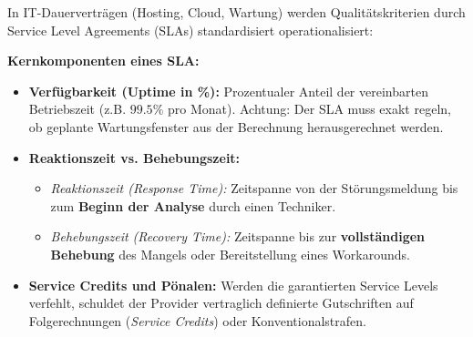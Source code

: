 In IT-Dauerverträgen (Hosting, Cloud, Wartung) werden Qualitätskriterien durch Service Level Agreements (SLAs) standardisiert operationalisiert:

\begin{definition}
    \textbf{Kernkomponenten eines SLA:}
    \begin{itemize}
        \item \textbf{Verfügbarkeit (Uptime in \%):} Prozentualer Anteil der vereinbarten Betriebszeit (z.B. $99.5\%$ pro Monat). Achtung: Der SLA muss exakt regeln, ob geplante Wartungsfenster aus der Berechnung herausgerechnet werden.
        \item \textbf{Reaktionszeit vs. Behebungszeit:}
        \begin{itemize}
            \item \textit{Reaktionszeit (Response Time):} Zeitspanne von der Störungsmeldung bis zum \textbf{Beginn der Analyse} durch einen Techniker.
            \item \textit{Behebungszeit (Recovery Time):} Zeitspanne bis zur \textbf{vollständigen Behebung} des Mangels oder Bereitstellung eines Workarounds.
        \end{itemize}
        \item \textbf{Service Credits und Pönalen:} Werden die garantierten Service Levels verfehlt, schuldet der Provider vertraglich definierte Gutschriften auf Folgerechnungen (\textit{Service Credits}) oder Konventionalstrafen.
    \end{itemize}
\end{definition}

